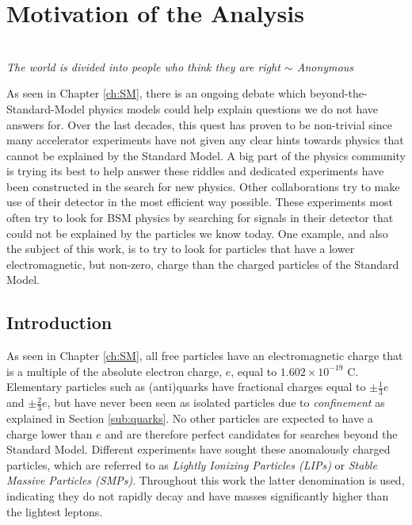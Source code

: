 \chapter{Motivation of the Analysis}
\label{ch:theoreticalmotivation}
\begin{flushright}
\textit{\\The world is divided into people who think they are right $\sim$ Anonymous\\}
\end{flushright}

\noindent As seen in Chapter \ref{ch:SM}, there is an ongoing debate which beyond-the-Standard-Model physics models could help explain questions we do not have answers for. Over the last decades, this quest has proven to be non-trivial since many accelerator experiments have not given any clear hints towards physics that cannot be explained by the Standard Model. A big part of the physics community is trying its best to help answer these riddles and dedicated experiments have been constructed in the search for new physics. Other collaborations try to make use of their detector in the most efficient way possible. These experiments most often try to look for BSM physics by searching for signals in their detector that could not be explained by the particles we know today. One example, and also the subject of this work, is to try to look for particles that have a lower electromagnetic, but non-zero, charge than the charged particles of the Standard Model.

\section{Introduction}
As seen in Chapter \ref{ch:SM}, all free particles have an electromagnetic charge that is a multiple of the absolute electron charge, $e$, equal to $1.602 \times 10^{-19}$ C. Elementary particles such as (anti)quarks have fractional charges equal to $\pm\frac{1}{3}e$ and $\pm\frac{2}{3}e$, but have never been seen as isolated particles due to \textit{confinement} as explained in Section \ref{sub:quarks}. No other particles are expected to have a charge lower than $e$ and are therefore perfect candidates for searches beyond the Standard Model. Different experiments have sought these anomalously charged particles, which are referred to as \textit{Lightly Ionizing Particles (LIPs)} or \textit{Stable Massive Particles (SMPs)}. Throughout this work the latter denomination is used, indicating they do not rapidly decay and have masses significantly higher than the lightest leptons.

